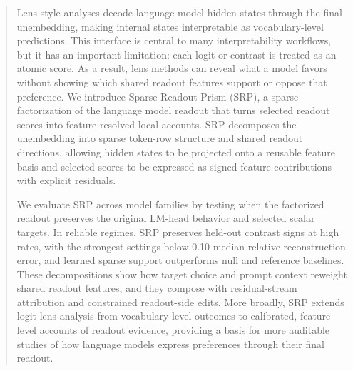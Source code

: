 \begin{abstract}
Lens-style analyses decode language model hidden states through the final
unembedding, making internal states interpretable as vocabulary-level
predictions. This interface is central to many interpretability workflows, but
it has an important limitation: each logit or contrast is treated as an atomic
score. As a result, lens methods can reveal what a model favors without showing
which shared readout features support or oppose that preference. We introduce
Sparse Readout Prism (SRP), a sparse factorization of the language model readout
that turns selected readout scores into feature-resolved local accounts. SRP
decomposes the unembedding into sparse token-row structure and shared readout
directions, allowing hidden states to be projected onto a reusable feature basis
and selected scores to be expressed as signed feature contributions with
explicit residuals.

We evaluate SRP across model families by testing when the factorized readout
preserves the original LM-head behavior and selected scalar targets. In reliable
regimes, SRP preserves held-out contrast signs at high rates, with the strongest
settings below 0.10 median relative reconstruction error, and learned sparse
support outperforms null and reference baselines. These decompositions show how
target choice and prompt context reweight shared readout features, and they
compose with residual-stream attribution and constrained readout-side edits. More
broadly, SRP extends logit-lens analysis from vocabulary-level outcomes to
calibrated, feature-level accounts of readout evidence, providing a basis for
more auditable studies of how language models express preferences through their
final readout.
\end{abstract}
